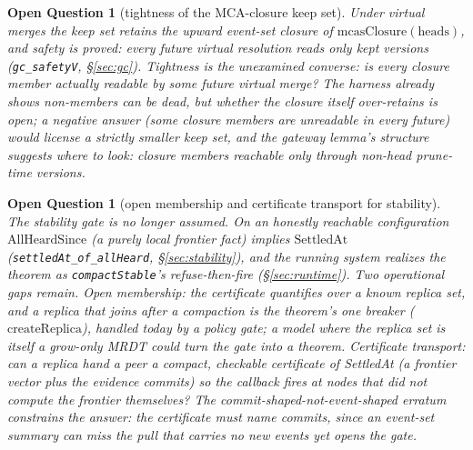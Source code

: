 \documentclass[11pt]{article}
\newtheorem{openq}[theorem]{Open Question}
\newcommand{\lean}[1]{\texttt{#1}}
\newcommand{\code}[1]{\texttt{#1}}
\begin{document}
\begin{openq}[tightness of the MCA-closure keep set]
\label{oq:mcastight}
Under virtual merges the keep set retains the upward event-set closure
of $\mathrm{mcasClosure}(\mathrm{heads})$, and safety is proved: every
future virtual resolution reads only kept versions
(\lean{gc\_safetyV}, \S\ref{sec:gc}). Tightness is the unexamined
converse: is every closure member actually readable by some future
virtual merge? The harness already shows non-members can be dead, but
whether the closure itself over-retains is open; a negative answer
(some closure members are unreadable in every future) would license a
strictly smaller keep set, and the gateway lemma's structure suggests
where to look: closure members reachable only through non-head
prune-time versions.
\end{openq}

\begin{openq}[open membership and certificate transport for stability]
\label{oq:evidence}
The stability gate is no longer assumed. On an honestly reachable
configuration $\mathrm{AllHeardSince}$ (a purely local frontier fact)
implies $\mathrm{SettledAt}$ (\lean{settledAt\_of\_allHeard},
\S\ref{sec:stability}), and the running system realizes the theorem as
\code{compactStable}'s refuse-then-fire (\S\ref{sec:runtime}). Two
operational gaps remain. \emph{Open membership}: the certificate
quantifies over a known replica set, and a replica that joins after a
compaction is the theorem's one breaker ($\mathrm{createReplica}$),
handled today by a policy gate; a model where the replica set is itself a
grow-only MRDT could turn the gate into a theorem. \emph{Certificate
transport}: can a replica hand a peer a compact, checkable certificate of
SettledAt (a frontier vector plus the evidence commits) so the callback
fires at nodes that did not compute the frontier themselves? The
commit-shaped-not-event-shaped erratum constrains the answer: the
certificate must name commits, since an event-set summary can miss the
pull that carries no new events yet opens the gate.
\end{openq}
\end{document}

